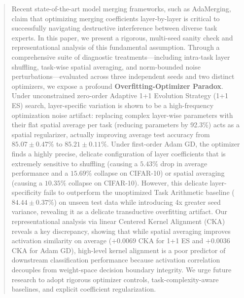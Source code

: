 \begin{abstract}
Recent state-of-the-art model merging frameworks, such as AdaMerging, claim that optimizing merging coefficients layer-by-layer is critical to successfully navigating destructive interference between diverse task experts. In this paper, we present a rigorous, multi-seed sanity check and representational analysis of this fundamental assumption. Through a comprehensive suite of diagnostic treatments---including intra-task layer shuffling, task-wise spatial averaging, and norm-bounded noise perturbations---evaluated across three independent seeds and two distinct optimizers, we expose a profound \textbf{Overfitting-Optimizer Paradox}. Under unconstrained zero-order Adaptive 1+1 Evolution Strategy (1+1 ES) search, layer-specific variation is shown to be a high-frequency optimization noise artifact: replacing complex layer-wise parameters with their flat spatial average per task (reducing parameters by 92.3\%) acts as a spatial regularizer, actually improving average test accuracy from $85.07 \pm 0.47\%$ to $85.21 \pm 0.11\%$. Under first-order Adam GD, the optimizer finds a highly precise, delicate configuration of layer coefficients that is extremely sensitive to shuffling (causing a $5.43\%$ drop in average performance and a $15.69\%$ collapse on CIFAR-10) or spatial averaging (causing a $10.35\%$ collapse on CIFAR-10). However, this delicate layer-specificity fails to outperform the unoptimized Task Arithmetic baseline ($84.44 \pm 0.37\%$) on unseen test data while introducing 4x greater seed variance, revealing it as a delicate transductive overfitting artifact. Our representational analysis via linear Centered Kernel Alignment (CKA) reveals a key discrepancy, showing that while spatial averaging improves activation similarity on average ($+0.0069$ CKA for 1+1 ES and $+0.0036$ CKA for Adam GD), high-level kernel alignment is a poor predictor of downstream classification performance because activation correlation decouples from weight-space decision boundary integrity. We urge future research to adopt rigorous optimizer controls, task-complexity-aware baselines, and explicit coefficient regularization.
\end{abstract}
